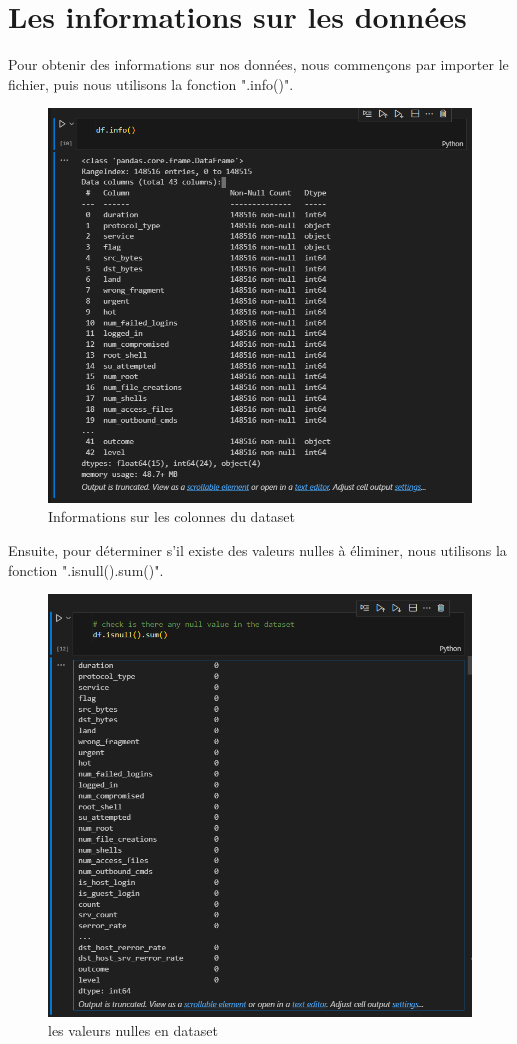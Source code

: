 \documentclass[a4paper,12pt]{report}
\begin{document}
\section {Les informations sur les données}
\noindent\normalsize Pour obtenir des informations sur nos données, nous commençons par importer le fichier, puis nous utilisons la fonction ".info()".
\begin{figure}[H]
\centering
 \includegraphics[scale=0.9]{outils-images/data1.png}
\caption{Informations sur les colonnes du dataset}
\end{figure}
\noindent\normalsize Ensuite, pour déterminer s'il existe des valeurs nulles à éliminer, nous utilisons la fonction ".isnull().sum()".
\begin{figure}[H]
\centering
 \includegraphics[scale=0.9]{outils-images/data3.png}
\caption{les valeurs nulles en dataset}
\end{figure}
\end{document}
